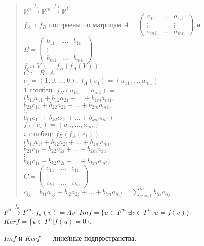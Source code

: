 \documentclass{article}
\begin{document}
	\begin{quote}
		$\mathbb{R}^n \xrightarrow{f_A} \mathbb{R}^m \xrightarrow{f_B} \mathbb{R}^k$ \\
		$f_A$ и $f_B$ построены по матрицам $A = \left(
		\begin{smallmatrix}
			a_{11} & \dots & a_{1n} \\
			\vdots &  & \vdots \\
			a_{m1} & \dots & a_{mn}
		\end{smallmatrix}
		\right)$ и $B = \left(
		\begin{smallmatrix}
			b_{11} & \dots & b_{1n} \\
			\vdots &  & \vdots \\
			b_{m1} & \dots & b_{mn}
		\end{smallmatrix}
		\right)$ \\
		$f_C (V) = f_B (f_A (V))$ \\
		$C := B \cdot A$ \\
		$e_1 = (1, 0, \dots, 0)$; $f_A (e_1) = (a_{11}, \dots, a_{m1})$ \\
		$1$ столбец: $f_B (a_{11}, \dots, a_{m1}) =$ \\
		$(b_{11} a_{11} + b_{12} a_{21} + \dots + b_{1m}a_{m1},$ \\
		$b_{21}a_{11} + b_{22} a_{21} + \dots + b_{2m} a_{m1},$ \\
		$\vdots,$ \\
		$b_{k1} a_{11} + b_{k2} a_{21} + \dots + b_{km} a_{m1})$ \\
		$f_A (e_i) = (a_{1i}, \dots, a_{mi})$ \\
		$i$ столбец: $f_B (f_A (e_i)) =$ \\
		$(b_{11} a_{1i} + b_{12} a_{2i} + \dots + b_{1m}a_{mi},$ \\
		$b_{21}a_{1i} + b_{22} a_{2i} + \dots + b_{2m} a_{mi},$ \\
		$\vdots,$ \\
		$b_{k1} a_{1i} + b_{k2} a_{2i} + \dots + b_{km} a_{mi})$ \\
		$C = \left(
		\begin{smallmatrix}
			c_{11} & \dots & c_{1n} \\
			\vdots &  & \vdots \\
			c_{k1} & \dots & c_{kn}
		\end{smallmatrix}
		\right)$ \\
		$c_{ij} = b_{i1} a_{1j} + b_{i2} a_{2j} + \dots + b_{im} a_{mj} = \sum\limits_{\alpha = 1}^{m}b_{i \alpha} a_{\alpha j}$
	\end{quote}
	\begin{definition}
		$F^n \xrightarrow{f_a} F^m$, $f_a (v) = Av$. $Im f = \{ u \in F^m | \exists v \in F^n : u = f(v) \}$. $Ker f = \{ u \in F^n | f(u) = 0 \}$.
	\end{definition}
	\begin{statement}
		$Im f$ и $Ker f$~--- линейные подпространства.
	\end{statement}
	
\end{document}
